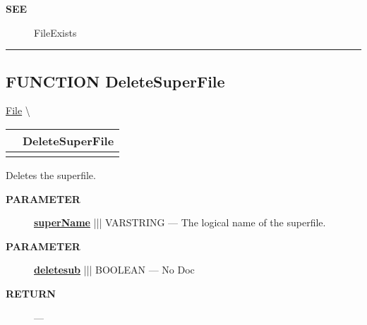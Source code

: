 \par
\begin{description}
\item [\colorbox{tagtype}{\color{white} \textbf{\textsf{SEE}}}] FileExists
\end{description}



\rule{\linewidth}{0.5pt}
\subsection*{\textsf{\colorbox{headtoc}{\color{white} FUNCTION}
DeleteSuperFile}}

\hypertarget{ecldoc:file.deletesuperfile}{}
\hspace{0pt} \hyperlink{ecldoc:File}{File} \textbackslash 

{\renewcommand{\arraystretch}{1.5}
\begin{tabularx}{\textwidth}{|>{\raggedright\arraybackslash}l|X|}
\hline
\hspace{0pt}\mytexttt{\color{red} } & \textbf{DeleteSuperFile} \\
\hline
\multicolumn{2}{|>{\raggedright\arraybackslash}X|}{\hspace{0pt}\mytexttt{\color{param} (varstring superName, boolean deletesub=FALSE)}} \\
\hline
\end{tabularx}
}

\par





Deletes the superfile.






\par
\begin{description}
\item [\colorbox{tagtype}{\color{white} \textbf{\textsf{PARAMETER}}}] \textbf{\underline{superName}} ||| VARSTRING --- The logical name of the superfile.
\item [\colorbox{tagtype}{\color{white} \textbf{\textsf{PARAMETER}}}] \textbf{\underline{deletesub}} ||| BOOLEAN --- No Doc
\end{description}







\par
\begin{description}
\item [\colorbox{tagtype}{\color{white} \textbf{\textsf{RETURN}}}] \textbf{} --- 
\end{description}







